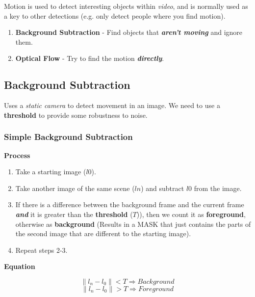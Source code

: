 \documentclass[english, 10pt]{article}
\begin{document}
Motion is used to detect interesting objects within \emph{video}, and is normally used as a key to other detections (e.g. only detect people where you find motion).

\begin{enumerate}
\def\labelenumi{\arabic{enumi}.}
\itemsep1pt\parskip0pt
\item
 \textbf{Background Subtraction} - Find objects that \textbf{\emph{aren't
  moving}} and ignore them. \\
\item
  \textbf{Optical Flow} - Try to find the motion \textbf{\emph{directly}}.
\end{enumerate}

\subsection{Background Subtraction}\label{background-subtraction}

Uses a \emph{static camera} to detect movement in an image. We need to
use a \textbf{threshold} to provide some robustness to noise.

\subsubsection{Simple Background
Subtraction}\label{simple-background-subtraction}

\textbf{Process}

\begin{enumerate}
\def\labelenumi{\arabic{enumi}.}
\itemsep1pt\parskip0pt
\item
  Take a starting image ($l0$).
\item
  Take another image of the same scene ($ln$) and subtract $l0$ from the image.
\item
  If there is a difference between the background frame and the current
  frame \textbf{\emph{and}} it is greater than the \textbf{threshold}
  ($T$)), then we count it as \textbf{foreground}, otherwise as
  \textbf{background} (Results in a MASK that just contains the parts of
  the second image that are different to the starting image).
\item
  Repeat steps 2-3.
\end{enumerate}

\textbf{Equation}

$$ \| l_n - l_0 \| < T \Longrightarrow Background$$
$$ \| l_n - l_0 \| > T \Longrightarrow Foreground$$
\end{document}
